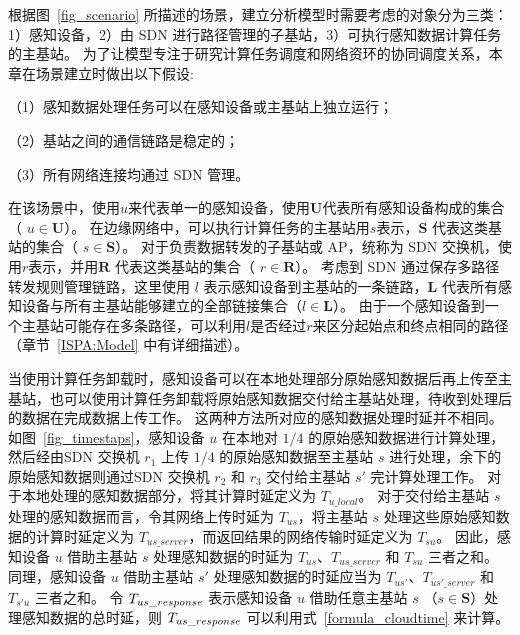 根据图~\ref{fig_scenario} 所描述的场景，建立分析模型时需要考虑的对象分为三类：
1）感知设备，2）由 SDN 进行路径管理的子基站，3）可执行感知数据计算任务的主基站。
为了让模型专注于研究计算任务调度和网络资环的协同调度关系，本章在场景建立时做出以下假设: 

（1）感知数据处理任务可以在感知设备或主基站上独立运行；

（2）基站之间的通信链路是稳定的；

（3）所有网络连接均通过 SDN 管理。



在该场景中，使用$u$来代表单一的感知设备，使用$\boldsymbol{U}$代表所有感知设备构成的集合（ $ u \in \boldsymbol{U} $）。
在边缘网络中，可以执行计算任务的主基站用$s$表示，$\boldsymbol{S}$ 代表这类基站的集合（ $ s \in \boldsymbol{S} $）。
对于负责数据转发的子基站或 AP，统称为 SDN 交换机，使用$r$表示，并用$\boldsymbol{R}$ 代表这类基站的集合（ $ r \in \boldsymbol{R} $）。
考虑到 SDN 通过保存多路径转发规则管理链路，这里使用 $l$ 表示感知设备到主基站的一条链路，$ \boldsymbol{L}$ 代表所有感知设备与所有主基站能够建立的全部链接集合（$l \in \boldsymbol{L} $）。
由于一个感知设备到一个主基站可能存在多条路径，可以利用$l$是否经过$r$来区分起始点和终点相同的路径（章节~\ref{ISPA:Model} 中有详细描述）。

当使用计算任务卸载时，感知设备可以在本地处理部分原始感知数据后再上传至主基站，也可以使用计算任务卸载将原始感知数据交付给主基站处理，待收到处理后的数据在完成数据上传工作。
这两种方法所对应的感知数据处理时延并不相同。
如图~\ref{fig_timestaps}，感知设备 $u$ 在本地对 $1/4$ 的原始感知数据进行计算处理，
然后经由SDN 交换机 $r_1$ 上传 $1/4$ 的原始感知数据至主基站 $s$ 进行处理，余下的原始感知数据则通过SDN 交换机 $r_2$ 和 $r_3$ 交付给主基站 $s'$ 完计算处理工作。
对于本地处理的感知数据部分，将其计算时延定义为 $T_{u\_local}$。
对于交付给主基站 $s$ 处理的感知数据而言，令其网络上传时延为 $T_{us}$，将主基站 $s$ 处理这些原始感知数据的计算时延定义为 $T_{us\_server}$，而返回结果的网络传输时延定义为 $T_{su}$。
因此，感知设备 $u$ 借助主基站 $s$ 处理感知数据的时延为 $T_{us}$、$T_{us\_server}$ 和 $T_{su}$ 三者之和。
同理，感知设备 $u$ 借助主基站 $s'$ 处理感知数据的时延应当为 $T_{us'}$、$T_{us'\_server}$ 和 $T_{s'u}$ 三者之和。
令 ${T}_{us\_response}$ 表示感知设备 $u$ 借助任意主基站 $s$ （$s \in \boldsymbol{S}$）处理感知数据的总时延，则 ${T}_{us\_response}$ 可以利用式~\eqref{formula_cloudtime} 来计算。

